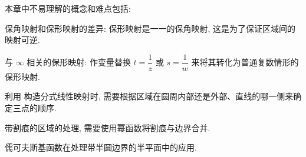本章中不易理解的概念和难点包括:
\begin{enuma}
  \item 保角映射和保形映射的差异: 保形映射是一一的保角映射, 这是为了保证区域间的映射可逆.
  \item 与 $\infty$ 相关的保形映射: 作变量替换 $t=\dfrac1z$ 或 $s=\dfrac1w$ 来将其转化为普通复数情形的保形映射.
  \item 利用 构造分式线性映射时, 需要根据区域在圆周内部还是外部、直线的哪一侧来确定三点的顺序.
  \item 带割痕的区域的处理, 需要使用幂函数将割痕与边界合并.
  \item 儒可夫斯基函数在处理带半圆边界的半平面中的应用.
\end{enuma}


